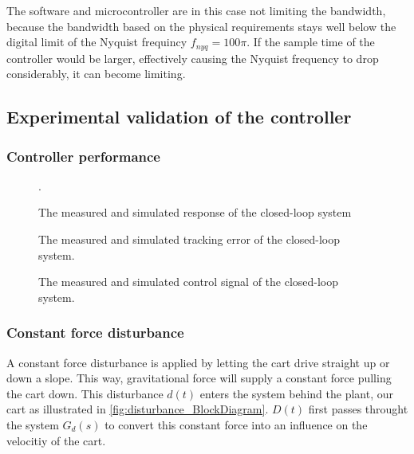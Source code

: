 \documentclass[a4paper]{article}
\newcommand{\newpar}{\vspace{.3cm}\noindent}
\begin{document}
\newpar
The software and microcontroller are in this case not limiting the bandwidth, because the bandwidth based on the physical requirements stays well below the digital limit of the Nyquist frequincy $f_{nyq} = 100\pi$. If the sample time of the controller would be larger, effectively causing the Nyquist frequency to drop considerably, it can become limiting.


\subsection{Experimental validation of the controller}
\subsubsection{Controller performance}

\begin{figure}[H]
    \caption{The measured and simulated response of the closed-loop system}.
    \label{fig:closed_loop_response}
\end{figure}

\begin{figure}[H]
    \caption{The measured and simulated tracking error of the closed-loop system.}
    \label{fig:tracking_error}
\end{figure}

\begin{figure}[H]
    \caption{The measured and simulated control signal of the closed-loop system.}
    \label{fig:control_signal}
\end{figure}

\subsubsection{Constant force disturbance}
A constant force disturbance is applied by letting the cart drive straight up or down a slope. This way, gravitational force will supply a constant force pulling the cart down. This disturbance $d(t)$ enters the system behind the plant, our cart as illustrated in \autoref{fig:disturbance_BlockDiagram}. $D(t)$ first passes throught the system $G_d(s)$ to convert this constant force into an influence on the velocitiy of the cart. 
\end{document}
